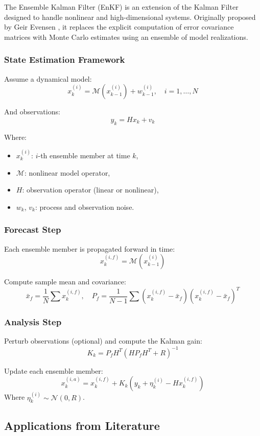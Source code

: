 \documentclass[a4paper]{article}
\begin{document}
The Ensemble Kalman Filter (EnKF) is an extension of the Kalman Filter designed to handle nonlinear and high-dimensional systems. Originally proposed by Geir Evensen \parencite{evensen1994sequential}, it replaces the explicit computation of error covariance matrices with Monte Carlo estimates using an ensemble of model realizations.

\subsubsection*{State Estimation Framework}

Assume a dynamical model:
\[
x_k^{(i)} = \mathcal{M}(x_{k-1}^{(i)}) + w_{k-1}^{(i)}, \quad i = 1, \ldots, N
\]

And observations:
\[
y_k = H x_k + v_k
\]

Where:
\begin{itemize}
  \item $x_k^{(i)}$: $i$-th ensemble member at time $k$,
  \item $\mathcal{M}$: nonlinear model operator,
  \item $H$: observation operator (linear or nonlinear),
  \item $w_k$, $v_k$: process and observation noise.
\end{itemize}

\subsubsection*{Forecast Step}

Each ensemble member is propagated forward in time:
\[
x_k^{(i,f)} = \mathcal{M}(x_{k-1}^{(i)})
\]

Compute sample mean and covariance:
\[
\bar{x}_f = \frac{1}{N} \sum x_k^{(i,f)}, \quad
P_f = \frac{1}{N - 1} \sum (x_k^{(i,f)} - \bar{x}_f)(x_k^{(i,f)} - \bar{x}_f)^T
\]

\subsubsection*{Analysis Step}

Perturb observations (optional) and compute the Kalman gain:
\[
K_k = P_f H^T (H P_f H^T + R)^{-1}
\]

Update each ensemble member:
\[
x_k^{(i,a)} = x_k^{(i,f)} + K_k \left(y_k + \eta_k^{(i)} - H x_k^{(i,f)}\right)
\]
Where $\eta_k^{(i)} \sim \mathcal{N}(0, R)$.

\subsection{Applications from Literature}
\end{document}
